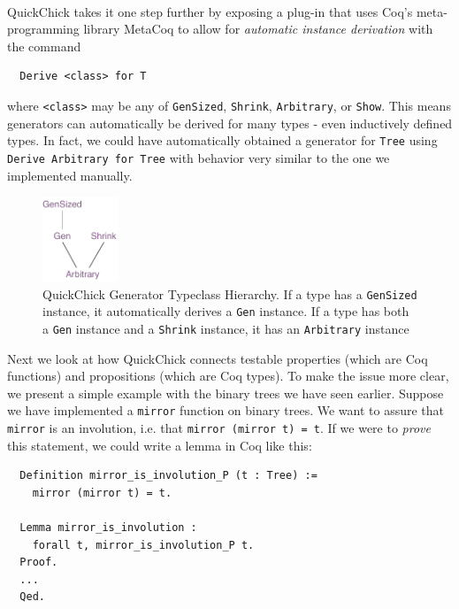 \documentclass[twoside,11pt,openright]{report}
\newenvironment{code}{\captionsetup{type=figure, singlelinecheck=off, justification=raggedleft}}{}
\newcommand{\coq}[1]{\texttt{#1}}
\begin{document}
\medskip\\
QuickChick takes it one step further by exposing a plug-in that uses Coq's meta-programming library MetaCoq to allow for \textit{automatic instance derivation} with the command
\begin{code}
\begin{verbatim}
  Derive <class> for T
\end{verbatim}
\end{code}
where \coq{<class>} may be any of \coq{GenSized}, \coq{Shrink}, \coq{Arbitrary}, or \coq{Show}. This means generators can automatically be derived for many types - even inductively defined types. In fact, we could have automatically obtained a generator for \coq{Tree} using \coq{Derive Arbitrary for Tree} with behavior very similar to the one we implemented manually.
\begin{figure}[h]
\begin{center}
\includegraphics[width=0.2\textwidth]{media/QC Generator Typeclasses Hierarchy.pdf}
\end{center}
\caption[Figure description for the QuickChick Generator Typeclass Hierarchy.]{QuickChick Generator Typeclass Hierarchy. If a type has a \coq{GenSized} instance, it automatically derives a \coq{Gen} instance. If a type has both a \coq{Gen} instance and a \coq{Shrink} instance, it has an \coq{Arbitrary} instance}
\label{fig:qc-generator-typeclass-hierarchy}
\end{figure}
Next we look at how QuickChick connects testable properties (which are Coq functions) and propositions (which are Coq types). To make the issue more clear, we present a simple example with the binary trees we have seen earlier. Suppose we have implemented a \coq{mirror} function on binary trees. We want to assure that \coq{mirror} is an involution, i.e. that \coq{mirror (mirror t) = t}. If we were to \textit{prove} this statement, we could write a lemma in Coq like this:
\begin{code}
\label{def:mirror_is_involution}
\begin{verbatim}
  Definition mirror_is_involution_P (t : Tree) := 
    mirror (mirror t) = t.
  
  Lemma mirror_is_involution : 
    forall t, mirror_is_involution_P t.
  Proof.
  ...
  Qed.
\end{verbatim}
\end{code}
\end{document}
